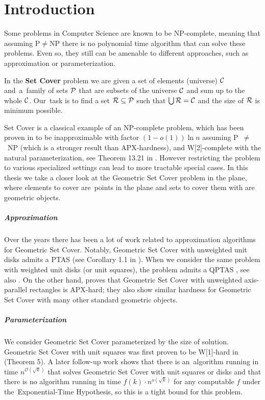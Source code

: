 \chapter{Introduction}

Some problems in Computer Science are known to be NP-complete,
meaning that assuming P$\neq$NP there is no polynomial time
algorithm that can solve these problems.
Even so, they still can be amenable to different approaches,
such as approximation or parameterization.

\begin{defi}
In the \textbf{Set Cover} problem we are given a set of elements (universe)
$\mathcal{C}$ and~a~family of sets $\mathcal{P}$ that are subsets of the universe $\mathcal{C}$
and sum up to the whole $\mathcal{C}$.
Our~task is to find a set $\mathcal{R} \subseteq \mathcal{P}$
such that $\bigcup \mathcal{R} = \mathcal{C}$ and the size of $\mathcal{R}$ is minimum possible.
\end{defi}

Set Cover is a classical example of an NP-complete problem,
which has been proven
in \cite{set_cover_inapproximation} to be
inapproximable with factor $(1-o(1))\ln n$ assuming P~$\neq$~NP
(which is a stronger result than APX-hardness),
and W[2]-complete with the natural parameterization,
see Theorem 13.21 in \cite{platypus_book}.
However restricting the problem to various specialized settings
can lead to more tractable special cases.
In this thesis we take a closer look at the Geometric Set Cover problem
in the plane, where elements to cover are~points in the plane
and sets to cover them with are geometric objects.

\paragraph{Approximation}
Over the years there has been a lot of work related to approximation
algorithms for Geometric Set Cover. Notably,
Geometric Set Cover with unweighted unit disks admits a PTAS (see
Corollary 1.1 in \cite{unit_disks}). When we consider the same problem
with weighted unit disks (or unit squares), the problem admits a QPTAS
\cite{settling_apx_hardness}, see also \cite{voronoi_true}.
On the other hand, \cite{rectangles_apx_hard} 
proves that Geometric Set Cover with unweighted axis-parallel rectangles
is APX-hard; they also show similar hardness
for Geometric Set Cover with many other standard geometric objects.

\paragraph{Parameterization}
We consider Geometric Set Cover 
parameterized by the size of solution.
Geometric Set Cover with unit squares was first proven to be W[1]-hard 
in \cite{marx05} (Theorem 5). A later follow-up work \cite{voronoi}
shows that there is an~algorithm running in time $n^{\mathcal{O}(\sqrt{k})}$
that solves Geometric Set Cover with unit squares or disks
and that there is no algorithm running in time $f(k) \cdot n^{o(\sqrt{k})}$
for any computable $f$ under the~Exponential-Time Hypothesis,
so this is a tight bound for this problem.

